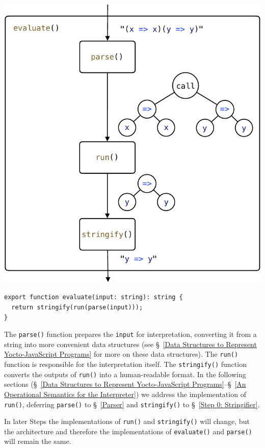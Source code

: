 \documentclass[12pt, oneside]{book}
\begin{document}
\begin{center}
\includegraphics[page = 1]{images.pdf}
\end{center}

\begin{verbatim}
export function evaluate(input: string): string {
  return stringify(run(parse(input)));
}
\end{verbatim}

The \texttt{parse()} function prepares the \texttt{input} for interpretation, converting it from a string into more convenient data structures (see §~\ref{Data Structures to Represent Yocto-JavaScript Programs} for more on these data structures). The \texttt{run()} function is responsible for the interpretation itself. The \texttt{stringify()} function converts the outputs of \texttt{run()} into a human-readable format. In the following sections (§~\ref{Data Structures to Represent Yocto-JavaScript Programs}–§~\ref{An Operational Semantics for the Interpreter}) we address the implementation of \texttt{run()}, deferring \texttt{parse()} to §~\ref{Parser} and \texttt{stringify()} to §~\ref{Step 0: Stringifier}.

In later Steps the implementations of \texttt{run()} and \texttt{stringify()} will change, but the architecture and therefore the implementations of \texttt{evaluate()} and \texttt{parse()} will remain the same.
\end{document}
